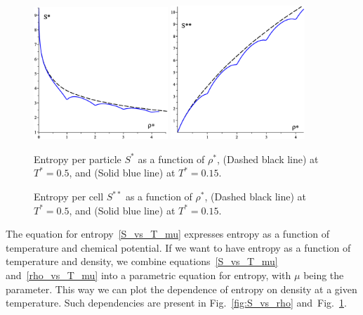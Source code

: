 \documentclass[12pt]{article}
\numberwithin{equation}{section}
\begin{document}
	\begin{figure}[htbp]
		\includegraphics[width=0.45\textwidth,angle=0]{S_vs_rho}
		\hfill
		\includegraphics[width=0.45\textwidth,angle=0]{SS_vs_rho}
		\\
		\parbox{0.45\textwidth}{\caption{\label{fig:S_vs_rho} Entropy per particle $S^{*}$ as a function of $\rho^*$, (Dashed black line) at $T^*=0.5$, and (Solid blue line) at $T^*=0.15$.}}
		\hfill
		\parbox{0.45\textwidth}{\caption{\label{fig:SS_vs_rho} Entropy per cell $S^{**}$ as a function of $\rho^*$, (Dashed black line) at $T^*=0.5$, and (Solid blue line) at $T^*=0.15$.}}
	\end{figure}
	
	The equation for entropy~\eqref{S_vs_T_mu} expresses entropy as a function of temperature and chemical potential. If we want to have entropy as a function of temperature and density, we combine equations~\eqref{S_vs_T_mu} and~\eqref{rho_vs_T_mu} into a parametric equation for entropy, with $\mu$ being the parameter. This way we can plot the dependence of entropy on density at a given temperature. Such dependencies are present in Fig.~\ref{fig:S_vs_rho} and~Fig.~\ref{fig:SS_vs_rho}.
	
	
\end{document}
